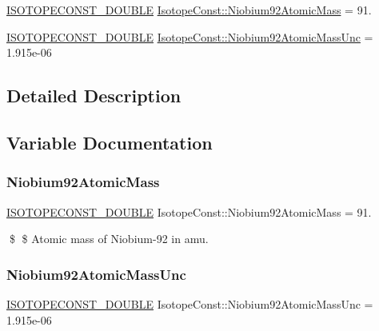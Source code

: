 \begin{DoxyCompactItemize}
\item 
\mbox{\hyperlink{group___isotope_const-_macros_ga8f45a7272ce02c0b4c65c44636ed719a}{I\+S\+O\+T\+O\+P\+E\+C\+O\+N\+S\+T\+\_\+\+D\+O\+U\+B\+LE}} \mbox{\hyperlink{group___isotope_const-_niobium-_nb92_ga075a93fd69bb16e612c7eb117e8c1a0d}{Isotope\+Const\+::\+Niobium92\+Atomic\+Mass}} = 91.
\item 
\mbox{\hyperlink{group___isotope_const-_macros_ga8f45a7272ce02c0b4c65c44636ed719a}{I\+S\+O\+T\+O\+P\+E\+C\+O\+N\+S\+T\+\_\+\+D\+O\+U\+B\+LE}} \mbox{\hyperlink{group___isotope_const-_niobium-_nb92_ga4298c644edc2cfcbb020a942b2880590}{Isotope\+Const\+::\+Niobium92\+Atomic\+Mass\+Unc}} = 1.\+915e-\/06
\end{DoxyCompactItemize}


\subsection{Detailed Description}


\subsection{Variable Documentation}
\mbox{\label{group___isotope_const-_niobium-_nb92_ga075a93fd69bb16e612c7eb117e8c1a0d}} 
\subsubsection{\texorpdfstring{Niobium92\+Atomic\+Mass}{Niobium92AtomicMass}}
{\footnotesize\ttfamily \mbox{\hyperlink{group___isotope_const-_macros_ga8f45a7272ce02c0b4c65c44636ed719a}{I\+S\+O\+T\+O\+P\+E\+C\+O\+N\+S\+T\+\_\+\+D\+O\+U\+B\+LE}} Isotope\+Const\+::\+Niobium92\+Atomic\+Mass = 91.}

\$ \$ Atomic mass of Niobium-\/92 in amu. \mbox{\label{group___isotope_const-_niobium-_nb92_ga4298c644edc2cfcbb020a942b2880590}} 
\subsubsection{\texorpdfstring{Niobium92\+Atomic\+Mass\+Unc}{Niobium92AtomicMassUnc}}
{\footnotesize\ttfamily \mbox{\hyperlink{group___isotope_const-_macros_ga8f45a7272ce02c0b4c65c44636ed719a}{I\+S\+O\+T\+O\+P\+E\+C\+O\+N\+S\+T\+\_\+\+D\+O\+U\+B\+LE}} Isotope\+Const\+::\+Niobium92\+Atomic\+Mass\+Unc = 1.\+915e-\/06}

